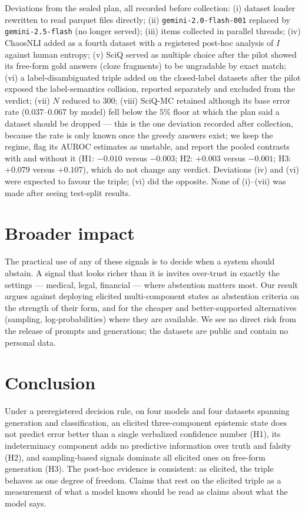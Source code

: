\documentclass[11pt]{article}
\begin{document}
Deviations from the sealed plan, all recorded before collection: (i) dataset loader rewritten to
read parquet files directly; (ii) \texttt{gemini-2.0-flash-001} replaced by
\texttt{gemini-2.5-flash} (no longer served); (iii) items collected in parallel threads; (iv)
ChaosNLI added as a fourth dataset with a registered post-hoc analysis of $I$ against human
entropy; (v) SciQ served as multiple choice after the pilot showed its free-form gold answers
(cloze fragments) to be ungradable by exact match; (vi) a label-disambiguated triple added on the
closed-label datasets after the pilot exposed the label-semantics collision, reported separately
and excluded from the verdict; (vii) $N$ reduced to $300$; (viii) SciQ-MC retained although its
base error rate ($0.037$--$0.067$ by model) fell below the $5\%$ floor at which the plan said a
dataset should be dropped --- this is the one deviation recorded after collection, because the
rate is only known once the greedy answers exist; we keep the regime, flag its AUROC estimates as
unstable, and report the pooled contrasts with and without it (H1: $-0.010$ versus $-0.003$; H2:
$+0.003$ versus $-0.001$; H3: $+0.079$ versus $+0.107$), which do not change any verdict.
Deviations (iv) and (vi) were expected to favour the triple; (vi) did the opposite. None of
(i)--(vii) was made after seeing test-split results.

\section{Broader impact}
The practical use of any of these signals is to decide when a system should abstain. A signal
that looks richer than it is invites over-trust in exactly the settings --- medical, legal,
financial --- where abstention matters most. Our result argues against deploying elicited
multi-component states as abstention criteria on the strength of their form, and for the cheaper
and better-supported alternatives (sampling, log-probabilities) where they are available. We see
no direct risk from the release of prompts and generations; the datasets are public and contain
no personal data.

\section{Conclusion}
Under a preregistered decision rule, on four models and four datasets spanning generation and
classification, an elicited three-component epistemic state does not predict error better than a
single verbalized confidence number (H1), its indeterminacy component adds no predictive
information over truth and falsity (H2), and sampling-based signals dominate all elicited ones on
free-form generation (H3). The post-hoc evidence is consistent: as elicited, the triple behaves
as one degree of freedom. Claims that rest on the elicited triple as a measurement of what a
model knows should be read as claims about what the model says.
\end{document}
